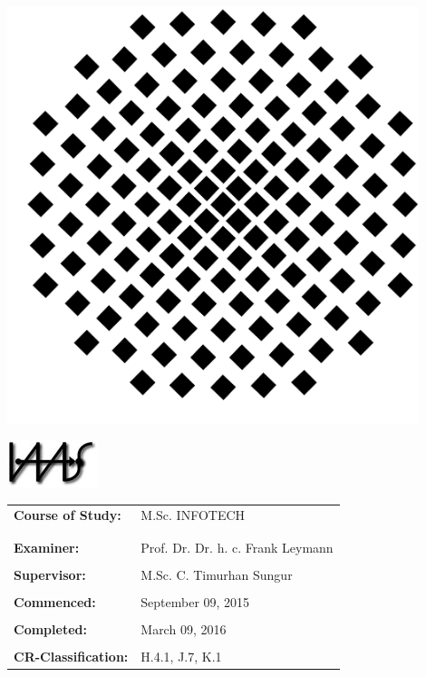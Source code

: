 \documentclass[paper=a4,       %
			 11pt,
			 BCOR0mm,  %
			 DIV10,    %
			 automark, %
			 twoside,
			 halfparskip,
			 bibtotoc,
			 headsepline,
			 normalheadings,
			 appendixprefix,
			 pagesize  %
 ]{scrbook}
\begin{document}
\begin{titlepage}
\begin{sffamily}
\begin{center}
\begin{minipage}{3cm}
\begin{center}
	\includegraphics[width=0.9\textwidth]{./gfx/unilogo.pdf}
\end{center}
\end{minipage}
\begin{minipage}{3cm}
\begin{center}
	\includegraphics{./gfx/iaas.jpg}
\end{center}
\end{minipage}
\end{center}
%
\vspace{1.0cm}
%
\begin{center}
\begin{tabular}{ll}
\textbf{Course of Study:} & M.Sc. INFOTECH\\
&\\&\\
\textbf{Examiner:} & Prof. Dr. Dr. h. c. Frank Leymann\\
&\\
\textbf{Supervisor:} & M.Sc. C. Timurhan Sungur\\
&\\                     
\textbf{Commenced:} & September 09, 2015\\
&\\
\textbf{Completed:} & March 09, 2016\\
&\\
\textbf{CR-Classification:} & H.4.1, J.7, K.1\\

\end{tabular}
\end{center}
\end{sffamily}
\end{titlepage}
\end{document}
